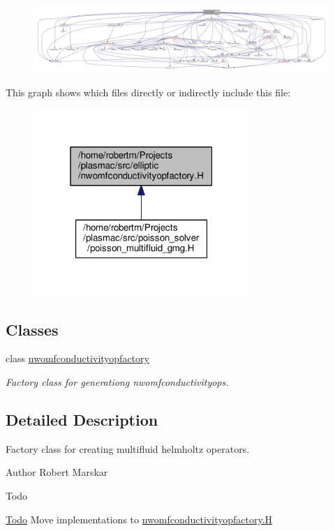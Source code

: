 \begin{figure}[H]
\begin{center}
\leavevmode
\includegraphics[width=350pt]{nwomfconductivityopfactory_8H__incl}
\end{center}
\end{figure}
This graph shows which files directly or indirectly include this file\+:\nopagebreak
\begin{figure}[H]
\begin{center}
\leavevmode
\includegraphics[width=232pt]{nwomfconductivityopfactory_8H__dep__incl}
\end{center}
\end{figure}
\subsection*{Classes}
\begin{DoxyCompactItemize}
\item 
class \hyperlink{classnwomfconductivityopfactory}{nwomfconductivityopfactory}
\begin{DoxyCompactList}\small\item\em Factory class for generationg nwomfconductivityop\textquotesingle{}s. \end{DoxyCompactList}\end{DoxyCompactItemize}


\subsection{Detailed Description}
Factory class for creating multifluid helmholtz operators. 

\begin{DoxyAuthor}{Author}
Robert Marskar 
\end{DoxyAuthor}
\begin{DoxyRefDesc}{Todo}
\item[\hyperlink{todo__todo000002}{Todo}]Move implementations to \hyperlink{nwomfconductivityopfactory_8H}{nwomfconductivityopfactory.\+H} \end{DoxyRefDesc}
